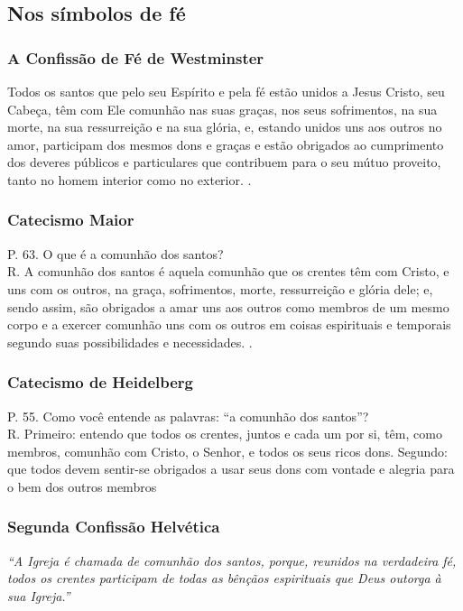 \subsection{Nos símbolos de fé}

\subsubsection{A Confissão de Fé de Westminster} 
\begin{citacao}
Todos os santos que pelo seu Espírito e pela fé estão unidos a Jesus Cristo, seu Cabeça, têm com Ele comunhão nas suas graças, nos seus sofrimentos, na sua morte, na sua ressurreição e na sua glória, e, estando unidos uns aos outros no amor, participam dos mesmos dons e graças e estão obrigados ao cumprimento dos deveres públicos e particulares que contribuem para o seu mútuo proveito, tanto no homem interior como no exterior. \cite{cfw}.
\end{citacao}

\subsubsection{Catecismo Maior} 
\begin{citacao}
P. 63. O que é a comunhão dos santos?\\
R. A comunhão dos santos é aquela comunhão que os crentes têm com Cristo, e uns com os outros, na graça, sofrimentos, morte, ressurreição e glória dele; e, sendo assim, são obrigados a amar uns aos outros como membros de um mesmo corpo e a exercer comunhão uns com os outros em coisas espirituais e temporais segundo suas possibilidades e necessidades. \cite{catecismoMaior}.
\end{citacao}

\subsubsection{Catecismo de Heidelberg}
\begin{citacao}
P. 55. Como você entende as palavras: ``a comunhão dos santos''?\\
R. Primeiro: entendo que todos os crentes, juntos e cada um por si, têm, como membros, comunhão com Cristo, o Senhor, e todos os seus ricos dons. Segundo: que todos devem sentir-se obrigados a usar seus dons com vontade e alegria para o bem dos outros membros \cite{heidelberg}
\end{citacao}

\subsubsection{Segunda Confissão Helvética} 
\textit{``A Igreja é chamada de comunhão dos santos, porque, reunidos na verdadeira fé, todos os crentes participam de todas as bênçãos espirituais que Deus outorga à sua Igreja.''} \cite{helvetica}

